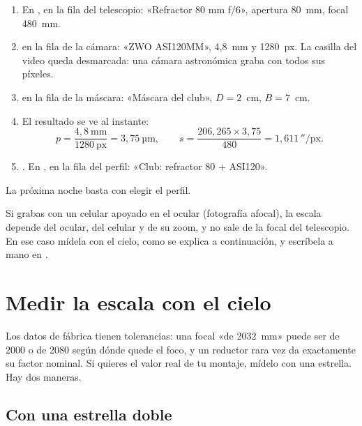 \begin{enumerate}
\item En ,  en la fila del telescopio: «Refractor 80 mm f/6», apertura 80~mm, focal
480~mm.
\item {} en la fila de la cámara: «ZWO ASI120MM», 4,8~mm y 1280~px. La casilla del video queda desmarcada:
una cámara astronómica graba con todos sus píxeles.
\item {} en la fila de la máscara: «Máscara del club», $D = 2$~cm, $B = 7$~cm.
\item El resultado se ve al instante:
\[
p = \frac{4{,}8\ \text{mm}}{1280\ \text{px}} = 3{,}75\ \text{µm},\qquad
s = \frac{206{,}265 \times 3{,}75}{480} = 1{,}611\,''/\text{px}.
\]
\item {}. En ,  en la fila del perfil: «Club: refractor 80 + ASI120».
\end{enumerate}

La próxima noche basta con elegir el perfil.

\begin{cuidado}
Si grabas con un celular apoyado en el ocular (fotografía afocal), la escala depende del ocular, del celular y de su
zoom, y no sale de la focal del telescopio. En ese caso mídela con el cielo, como se explica a continuación, y escríbela a
mano en .
\end{cuidado}

\section{Medir la escala con el cielo}\label{sec:medir_escala}

Los datos de fábrica tienen tolerancias: una focal «de 2032~mm» puede ser de 2000 o de 2080 según dónde quede el foco,
y un reductor rara vez da exactamente su factor nominal. Si quieres el valor real de tu montaje, mídelo con una
estrella. Hay dos maneras.

\subsection{Con una estrella doble}

